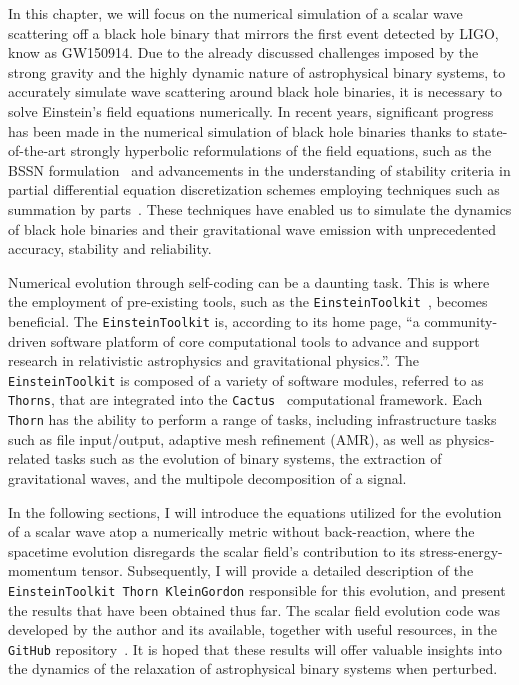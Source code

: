 In this chapter, we will focus on the numerical simulation of a scalar wave scattering off a black hole binary that mirrors the first event detected by LIGO, know as GW150914. Due to the already discussed challenges imposed by the strong gravity and the highly dynamic nature of astrophysical binary systems, to accurately simulate wave scattering around black hole binaries, it is necessary to solve Einstein's field equations numerically. In recent years, significant progress has been made in the numerical simulation of black hole binaries thanks to state-of-the-art strongly hyperbolic reformulations of the field equations, such as the BSSN formulation~\cite{PhysRevD.52.5428,PhysRevD.59.024007} and advancements in the understanding of stability criteria in partial differential equation discretization schemes employing techniques such as summation by parts~\cite{Diener2007}. These techniques have enabled us to simulate the dynamics of black hole binaries and their gravitational wave emission with unprecedented accuracy, stability and reliability.

Numerical evolution through self-coding can be a daunting task. This is where the employment of pre-existing tools, such as the \texttt{EinsteinToolkit}~\cite{EinsteinToolkit:2022_11}, becomes beneficial. The \texttt{EinsteinToolkit} is, according to its home page, ``a community-driven software platform of core computational tools to advance and support research in relativistic astrophysics and gravitational physics.''. The \texttt{EinsteinToolkit} is composed of a variety of software modules, referred to as \texttt{Thorns}, that are integrated into the \texttt{Cactus}~\cite{Cactuscode:web,Cactusprize:web,Goodale:2002a} computational framework. Each \texttt{Thorn} has the ability to perform a range of tasks, including infrastructure tasks such as file input/output, adaptive mesh refinement (AMR), as well as physics-related tasks such as the evolution of binary systems, the extraction of gravitational waves, and the multipole decomposition of a signal.

In the following sections, I will introduce the equations utilized for the evolution of a scalar wave atop a numerically metric without back-reaction, where the spacetime evolution disregards the scalar field's contribution to its stress-energy-momentum tensor. Subsequently, I will provide a detailed description of the \texttt{EinsteinToolkit Thorn KleinGordon} responsible for this evolution, and present the results that have been obtained thus far. The scalar field evolution code was developed by the author and its available, together with useful resources, in the \texttt{GitHub} repository~\cite{FieldPerturbationsRepo}. It is hoped that these results will offer valuable insights into the dynamics of the relaxation of astrophysical binary systems when perturbed.